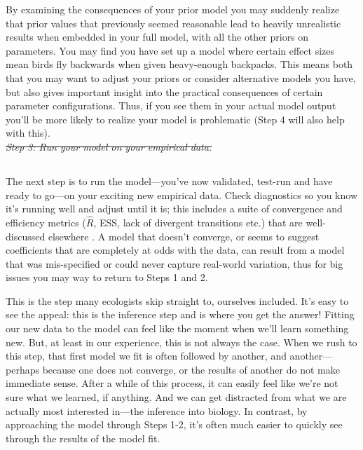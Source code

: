 \documentclass[11pt]{article}
\providecommand{\DIFaddtex}[1]{{\protect\color{blue}\uwave{#1}}} %
\providecommand{\DIFdeltex}[1]{{\protect\color{red}\sout{#1}}}                      %
\providecommand{\DIFaddbegin}{} %
\providecommand{\DIFaddend}{} %
\providecommand{\DIFdelbegin}{} %
\providecommand{\DIFdelend}{} %
\providecommand{\DIFadd}[1]{\texorpdfstring{\DIFaddtex{#1}}{#1}} %
\providecommand{\DIFdel}[1]{\texorpdfstring{\DIFdeltex{#1}}{}} %
\newcommand{\DIFscaledelfig}{0.5}
\newlength{\DIFdelgraphicswidth} %
\newlength{\DIFdelgraphicsheight} %
\newcommand{\DIFaddincludegraphics}[2][]{{\color{blue}\fbox{\DIFOincludegraphics[#1]{#2}}}} %
\newcommand{\DIFdelincludegraphics}[2][]{%
\sbox{\DIFdelgraphicsbox}{\DIFOincludegraphics[#1]{#2}}%
\settoboxwidth{\DIFdelgraphicswidth}{\DIFdelgraphicsbox} %
\settoboxtotalheight{\DIFdelgraphicsheight}{\DIFdelgraphicsbox} %
\scalebox{\DIFscaledelfig}{%
\parbox[b]{\DIFdelgraphicswidth}{\usebox{\DIFdelgraphicsbox}\\[-\baselineskip] \rule{\DIFdelgraphicswidth}{0em}}\llap{\resizebox{\DIFdelgraphicswidth}{\DIFdelgraphicsheight}{%
\setlength{\unitlength}{\DIFdelgraphicswidth}%
\begin{picture}(1,1)%
\thicklines\linethickness{2pt} %
{\color[rgb]{1,0,0}\put(0,0){\framebox(1,1){}}}%
{\color[rgb]{1,0,0}\put(0,0){\line( 1,1){1}}}%
{\color[rgb]{1,0,0}\put(0,1){\line(1,-1){1}}}%
\end{picture}%
}\hspace*{3pt}}} %
} %
\DeclareRobustCommand{\DIFaddbegin}{\DIFOaddbegin \let\includegraphics\DIFaddincludegraphics} %
\DeclareRobustCommand{\DIFaddend}{\DIFOaddend \let\includegraphics\DIFOincludegraphics} %
\DeclareRobustCommand{\DIFdelbegin}{\DIFOdelbegin \let\includegraphics\DIFdelincludegraphics} %
\DeclareRobustCommand{\DIFdelend}{\DIFOaddend \let\includegraphics\DIFOincludegraphics} %
\begin{document}
By examining the consequences of your prior model you may suddenly realize that prior values that previously seemed reasonable lead to heavily unrealistic results when embedded in your full model, with all the other priors on parameters. You may find you have set up a model where certain effect sizes mean birds fly backwards when given heavy-enough backpacks. This means both that you may want to adjust your priors or consider alternative models you have, but also gives important insight into the practical consequences of certain parameter configurations. Thus, if you see them in your actual model output you'll be more likely to realize your model is problematic (Step 4 will also help with this).\\

 \DIFdelbegin \emph{\DIFdel{Step 3: Run your model on your empirical data.}} 
\DIFdelend \DIFaddbegin \subsection{\DIFadd{Step 3: Run your model on your empirical data.}} 
 \DIFaddend 

The next step is to run the model---you've now validated, test-run and have ready to go---on your exciting new empirical data. Check diagnostics so you know it's running well and adjust until it is; this includes a suite of convergence and efficiency metrics ($\hat{R}$, ESS, lack of divergent transitions etc.) that are well-discussed elsewhere \citep[and not our focus here, see instead][]{betanworkflow,gelman2020bayesian,vandeschoot2021,gabryvis}. A model that doesn't converge, or seems to suggest coefficients that are completely at odds with the data, can result from a model that was mis-specified or could never capture real-world variation, thus for big issues you may way to return to  Steps 1 and 2.

This is the step many ecologists skip straight to, ourselves included. It's easy to see the appeal: this is the inference step and is where you get the answer! Fitting our new data to the model can feel like the moment when we'll learn something new. But, at least in our experience, this is not always the case. When we rush to this step, that first model we fit is often followed by another, and another---perhaps because one does not converge, or the results of another do not make immediate sense. After a while of this process, it can easily feel like we're not sure what we learned, if anything. And we can get distracted from what we are actually most interested in---the inference into biology. In contrast, by approaching the model through Steps 1-2, it's often much easier to quickly see through the results of the model fit. 
\end{document}
